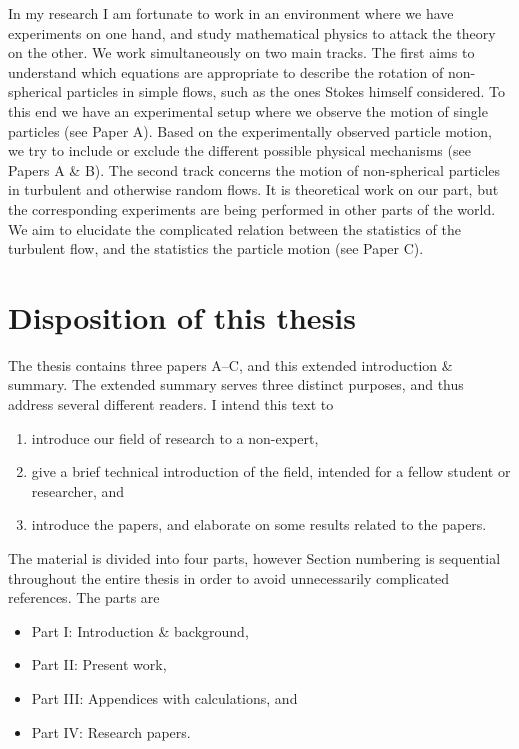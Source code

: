 \documentclass[thesis.tex]{subfiles}
\begin{document}
In my research I am fortunate to work in an environment where we have experiments on one hand, and study mathematical physics to attack the theory on the other. We work simultaneously on two main tracks. The first aims to understand which equations are appropriate to describe the rotation of non-spherical particles in simple flows, such as the ones Stokes himself considered. To this end we have an experimental setup where we observe the motion of single particles (see Paper A). Based on the experimentally observed particle motion, we try to include or exclude the different possible physical mechanisms (see Papers A \& B). The second track concerns the motion of non-spherical particles in turbulent and otherwise random flows. It is theoretical work on our part, but the corresponding experiments are being performed in other parts of the world. We aim to elucidate the complicated relation between the statistics of the turbulent flow, and the statistics the particle motion (see Paper C).


\section*{Disposition of this thesis}

The thesis contains three papers A--C, and this extended introduction \& summary. The extended summary serves three distinct purposes, and thus address several different readers. I intend this text to 
\begin{enumerate}
	\item introduce our field of research to a non-expert,
	\item give a brief technical introduction of the field, intended for a fellow student or researcher, and
	\item introduce the papers, and elaborate on some results related to the papers.
\end{enumerate}
The material is divided into four parts, however Section numbering is sequential throughout the entire thesis in order to avoid unnecessarily complicated references. The parts are
\begin{itemize}
	\item Part I: Introduction \& background,
	\item Part II: Present work,
	\item Part III: Appendices with calculations, and
	\item Part IV: Research papers.
\end{itemize}
\end{document}
